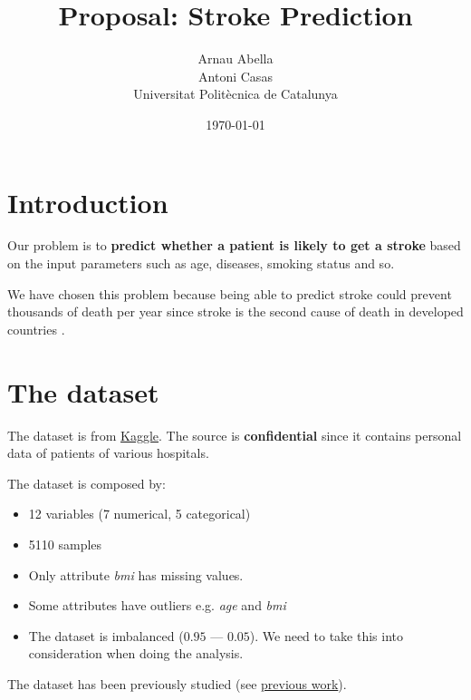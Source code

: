 \documentclass[12pt, a4paper]{article}
\title{%
  \vspace{-10ex}
  Proposal: Stroke Prediction
}
\author{%
  Arnau Abella \\
  Antoni Casas \\
  \large{Universitat Polit\`ecnica de Catalunya}
}
\date{\today}
\begin{document}
\maketitle

\vspace{5ex}

\section{Introduction}
\label{sec:introduction}

Our problem is to \textbf{predict whether a patient is likely to get a stroke} based on
the input parameters such as age, diseases, smoking status and so.

We have chosen this problem because being able to predict stroke could prevent thousands of death per year since stroke is the second  cause of death in developed countries \cite{who}.

\section{The dataset}
\label{sec:dataset}

The dataset is from \href{https://www.kaggle.com/fedesoriano/stroke-prediction-dataset}{Kaggle}. The source is \textbf{confidential} since it contains personal data of patients of various hospitals.

The dataset is composed by:

\begin{itemize}
  \item 12 variables (7 numerical, 5 categorical)
  \item 5110 samples
  \item Only attribute \textit{bmi} has missing values.
  \item Some attributes have outliers e.g. \textit{age} and \textit{bmi}
  \item The dataset is imbalanced ($0.95$ --- $0.05$). We need to take this into consideration when doing the analysis.
\end{itemize}

The dataset has been previously studied (see \href{https://www.kaggle.com/fedesoriano/stroke-prediction-dataset/code}{previous work}).
\end{document}
